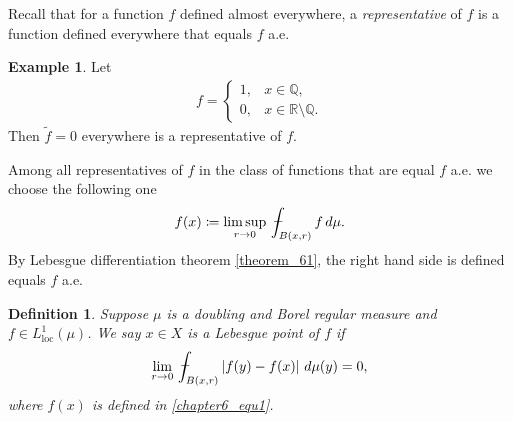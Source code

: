 \documentclass[11pt]{book}
\newtheorem{definition}{Definition}[chapter]
\theoremstyle{definition}
\newtheorem{example}{Example}[chapter]
\numberwithin{equation}{chapter}
\def\avint{\,\ThisStyle{\ensurestackMath{%
  \stackinset{c}{.2\LMpt}{c}{1\LMpt}{\SavedStyle-}{\SavedStyle\phantom{\int}}}%
  \setbox0=\hbox{$\SavedStyle\int\,$}\kern-\wd0}\int}
\begin{document}
\medskip

Recall that for a function $f$ defined almost everywhere, a {\em representative} of $f$ is a function defined everywhere that equals $f$ a.e.

\medskip

\begin{example}
Let
\begin{align*}
    f = \begin{cases}
        1, & x \in \mathbb{Q}, \\
        0, & x \in \mathbb{R} \setminus \mathbb{Q}.
    \end{cases}
\end{align*}
Then $\widetilde{f} = 0$ everywhere is a representative of $f$. 
\end{example}

\medskip

Among all representatives of $f$ in the class of functions that are equal $f$ a.e. we choose the following one 
\begin{align}\label{chapter6_equ1}
    f(x) \coloneqq \limsup_{r\to 0} \avint_{B(x,r)} f \,d\mu.
\end{align}
By Lebesgue  differentiation  theorem \ref{theorem_61}, the right hand side is defined equals $f$ a.e.

\medskip

\begin{definition}
Suppose $\mu$ is a doubling and Borel regular measure and $f \in L^1_{\operatorname{loc}}(\mu)$. We say $x \in X$ is a Lebesgue point of $f$ if
\begin{align*}
    \lim_{r\to 0} \avint_{B(x,r)} \left|f(y) - f(x)\right| \,d\mu(y) = 0,
\end{align*}
where $f(x)$ is defined in \eqref{chapter6_equ1}.
\end{definition}

\medskip
\end{document}

